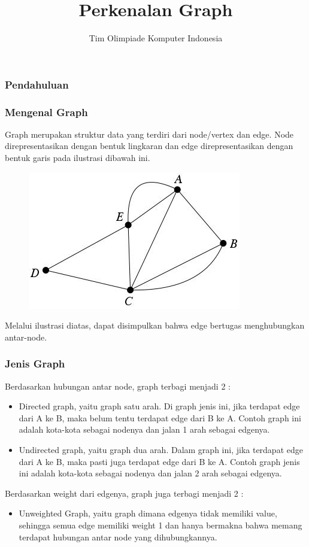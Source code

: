 

\title{Perkenalan Graph}
\author{Tim Olimpiade Komputer Indonesia}
\date{}



\begin{frame}
\titlepage
\end{frame}

\begin{frame}
\frametitle{Pendahuluan}

\end{frame}

\begin{frame}
\frametitle{Mengenal Graph}
Graph merupakan struktur data yang terdiri dari \alert{node/vertex} dan \alert{edge}. Node direpresentasikan dengan bentuk lingkaran dan edge direpresentasikan dengan bentuk garis pada ilustrasi dibawah ini.

\begin{figure}
	\centering
	\includegraphics[width=6 cm]{asset/graph.jpg}
\end{figure}
\end{frame}

\begin{frame}
Melalui ilustrasi diatas, dapat disimpulkan bahwa edge bertugas menghubungkan antar-node.  
\end{frame}

\begin{frame}
\frametitle{Jenis Graph}
Berdasarkan hubungan antar node, graph terbagi menjadi 2 :
\begin{itemize}
	\item Directed graph, yaitu graph satu arah. Di graph jenis ini, jika terdapat edge dari A ke B, maka belum tentu terdapat edge dari B ke A. Contoh graph ini adalah kota-kota sebagai nodenya dan jalan 1 arah sebagai edgenya.
	\item Undirected graph, yaitu graph dua arah. Dalam graph ini, jika terdapat edge dari A ke B, maka pasti juga terdapat edge dari B ke A. Contoh graph jenis ini adalah kota-kota sebagai nodenya dan jalan 2 arah sebagai edgenya.
\end{itemize}
Berdasarkan weight dari edgenya, graph juga terbagi menjadi 2 :
\begin{itemize}
	\item Unweighted Graph, yaitu graph dimana edgenya tidak memiliki value, sehingga semua edge memiliki weight 1 dan hanya bermakna bahwa memang terdapat hubungan antar node yang dihubungkannya. 
\end{itemize}
\end{frame}


